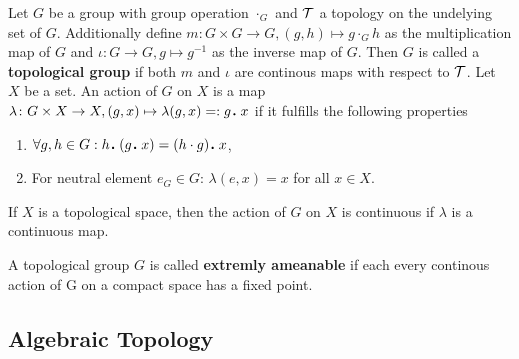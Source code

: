 \begin{defin}
  Let $G$ be a group with group operation $\cdot_G$ and $\mathcal{T}$ a topology on the undelying set of $G$. Additionally define $m\colon G \times G \to G, (g, h) \mapsto g \cdot_G h$ as the multiplication map of $G$ and $\iota\colon G \to G, g \mapsto g^{-1}$ as the inverse map of $G$. Then $G$ is called a \textbf{topological group} if both $m$ and $\iota$ are continous maps with respect to $\mathcal{T}$.
  Let $X$ be a set. An action of $G$ on $X$ is a map $\lambda\colon G\times X \to X, (g, x) \mapsto \lambda(g, x) =: g \anddot x$ if it fulfills the following properties
  \begin{enumerate}
    \item $\forall g, h \in G: h \anddot (g \anddot x) = (h \cdot g) \anddot x$,
    \item For neutral element $e_G \in G$: $\lambda(e, x) = x$ for all $x \in X$.
  \end{enumerate}
  If $X$ is a topological space, then the action of $G$ on $X$ is continuous if $\lambda$ is a continuous map.
\end{defin}

\begin{defin}
  A topological group $G$ is called \textbf{extremly ameanable} if each every continous action of G on a compact space has a fixed point.
\end{defin}

\subsection{Algebraic Topology}
